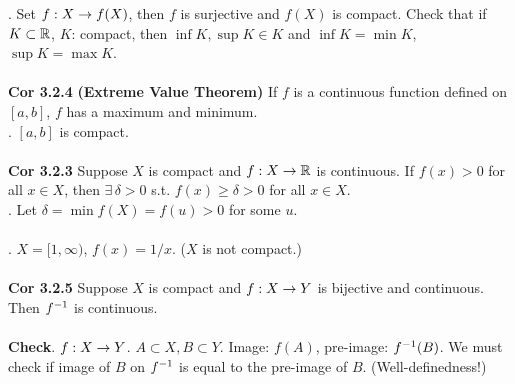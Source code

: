 \pf. Set $f: X\rightarrow f(X)$, then $f$ is surjective and $f(X)$ is compact. Check that if $K\subset \mathbb{R}$, $K$: compact, then $\inf K, \sup K \in K$ and $\inf K = \min K$, $\sup K = \max K$.\\
\\
\textbf{Cor 3.2.4} \textbf{(Extreme Value Theorem)} If $f$ is a continuous function defined on $[a, b]$, $f$ has a maximum and minimum.\\
\pf. $[a, b]$ is compact.\\
\\
\textbf{Cor 3.2.3} Suppose $X$ is compact and $f:X\rightarrow \mathbb{R}$ is continuous. If $f(x) > 0$ for all $x\in X$, then $\exists\, \delta > 0$ s.t. $f(x)\geq \delta >0$ for all $x\in X$.\\
\pf. Let $\delta = \min f(X) = f(u) > 0$ for some $u$.\\
\\
\rmk. $X = [1, \infty)$, $f(x) = 1/x$. ($X$ is not compact.)\\
\\
\textbf{Cor 3.2.5} Suppose $X$ is compact and $f:X\rightarrow Y$ is bijective and continuous. Then $f^{-1}$ is continuous.\\
\\
\textbf{Check}. $f:X\rightarrow Y$. $A\subset X, B\subset Y$. Image: $f(A)$, pre-image: $f^{-1} (B)$. We must check if image of $B$ on $f^{-1}$ is equal to the pre-image of $B$. (Well-definedness!)
\pagebreak